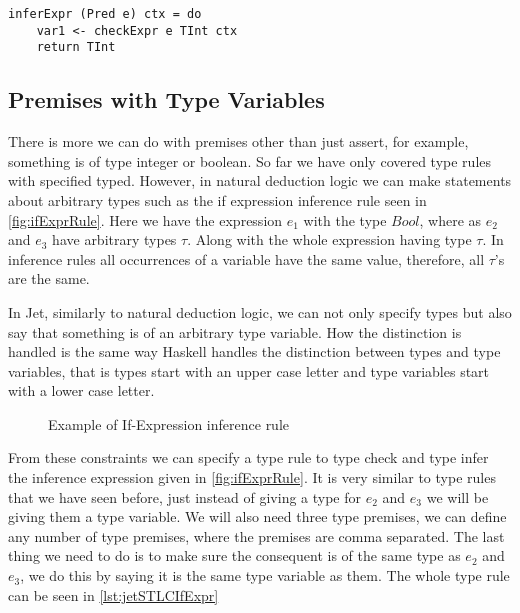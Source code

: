 \begin{lstlisting}[caption = Code generated for inferExpr from TExprPred, label=lst:codeTExprPredInfer]
inferExpr (Pred e) ctx = do
    var1 <- checkExpr e TInt ctx
    return TInt
\end{lstlisting}

\subsection{Premises with Type Variables}
There is more we can do with premises other than just assert, for example, something is of type integer or boolean.
So far we have only covered type rules with specified typed.
However, in natural deduction logic we can make statements about arbitrary types such as the if expression inference rule seen in \autoref{fig:ifExprRule}.
Here we have the expression $e_1$ with the type $Bool$, where as $e_2$ and $e_3$ have arbitrary types $\tau$.
Along with the whole expression having type $\tau$.
In inference rules all occurrences of a variable have the same value, therefore, all $\tau$'s are the same.

In Jet, similarly to natural deduction logic, we can not only specify types but also say that something is of an arbitrary type variable.
How the distinction is handled is the same way Haskell handles the distinction between types and type variables, that is types start with an upper case letter and type variables start with a lower case letter.

\begin{figure}[tbp]
    \begin{prooftree}
    \end{prooftree}
    \label{fig:ifExprRule}
    \caption{Example of If-Expression inference rule}
\end{figure}

From these constraints we can specify a type rule to type check and type infer the inference expression given in \autoref{fig:ifExprRule}.
It is very similar to type rules that we have seen before, just instead of giving a type for $e_2$ and $e_3$ we will be giving them a type variable.
We will also need three type premises, we can define any number of type premises, where the premises are comma separated.
The last thing we need to do is to make sure the consequent is of the same type as $e_2$ and $e_3$, we do this by saying it is the same type variable as them.
The whole type rule can be seen in \autoref{lst:jetSTLCIfExpr}

